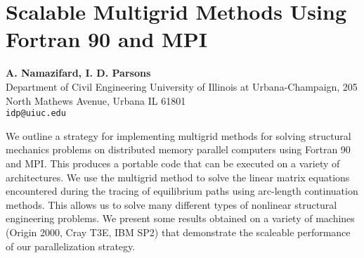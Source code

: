 \documentclass[11pt]{article}
\newcommand{\nextab}[4]{
	\section{#2}
	{\bf #1} \\ \nopagebreak
	{#3} \\ \nopagebreak
	{\tt #4} \nopagebreak
	}
\begin{document}

\nextab{A. Namazifard, I. D. Parsons}
	{Scalable Multigrid Methods Using Fortran 90 and MPI}
	{Department of Civil Engineering
		University of Illinois at Urbana-Champaign,
		205 North Mathews Avenue, Urbana IL 61801}
	{idp@uiuc.edu}

We outline a strategy for implementing multigrid methods for solving
structural mechanics problems on distributed memory parallel computers
using Fortran 90 and MPI. This produces a portable code that can be executed
on a variety of architectures. We use the multigrid method to solve the
linear matrix equations encountered during the tracing of equilibrium paths
using arc-length continuation methods. This allows us to solve many different
types of nonlinear structural engineering problems. We present some results
obtained on a variety of machines (Origin 2000, Cray T3E, IBM SP2) that
demonstrate the scaleable performance of our parallelization strategy.
\end{document}
